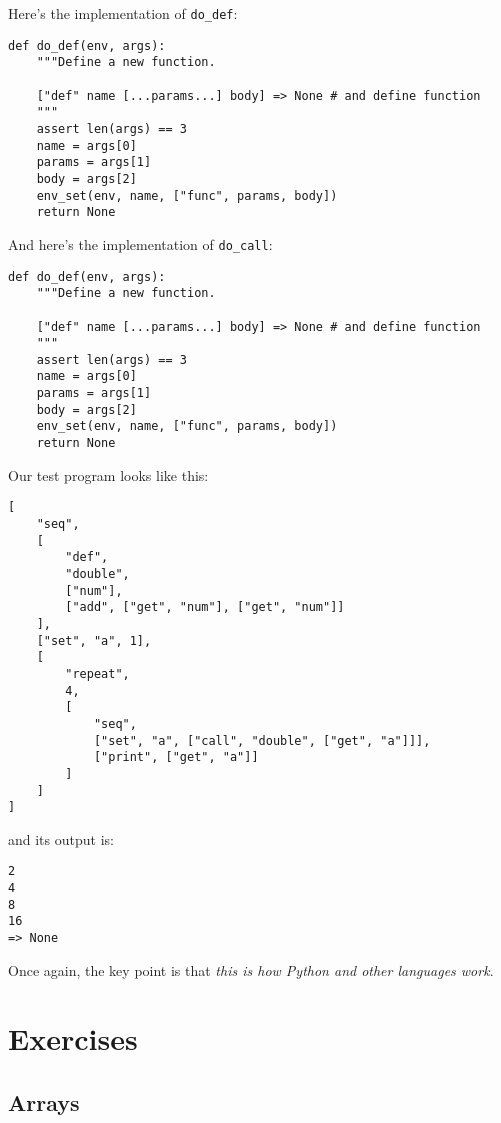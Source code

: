 \documentclass{scrbook}
\begin{document}
Here's the implementation of \texttt{do\_def}:


\begin{lstlisting}[frame=single,frameround=tttt]
def do_def(env, args):
    """Define a new function.

    ["def" name [...params...] body] => None # and define function
    """
    assert len(args) == 3
    name = args[0]
    params = args[1]
    body = args[2]
    env_set(env, name, ["func", params, body])
    return None
\end{lstlisting}



And here's the implementation of \texttt{do\_call}:


\begin{lstlisting}[frame=single,frameround=tttt]
def do_def(env, args):
    """Define a new function.

    ["def" name [...params...] body] => None # and define function
    """
    assert len(args) == 3
    name = args[0]
    params = args[1]
    body = args[2]
    env_set(env, name, ["func", params, body])
    return None
\end{lstlisting}



Our test program looks like this:


\begin{lstlisting}[frame=single,frameround=tttt]
[
    "seq",
    [
        "def",
        "double",
        ["num"],
        ["add", ["get", "num"], ["get", "num"]]
    ],
    ["set", "a", 1],
    [
        "repeat",
        4,
        [
            "seq",
            ["set", "a", ["call", "double", ["get", "a"]]],
            ["print", ["get", "a"]]
        ]
    ]
]
\end{lstlisting}



\noindent and its output is:


\begin{lstlisting}[frame=single,frameround=tttt]
2
4
8
16
=> None
\end{lstlisting}



Once again,
the key point is that
\emph{this is how Python and other languages work}.

\section{Exercises}\label{interpreter-exercises}

\subsection*{Arrays}
\end{document}
